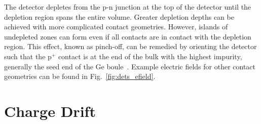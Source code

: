 The detector depletes from the p-n junction at the top of the detector until the depletion region spans the entire volume. Greater depletion depths can be achieved with more complicated contact geometries. However, islands of undepleted zones can form even if all contacts are in contact with the depletion region. This effect, known as pinch-off, can be remedied by orienting the detector such that the p$^+$ contact is at the end of the bulk with the highest impurity, generally the seed end of the Ge boule~\cite{mjd_og}. Example electric fields for other contact geometries can be found in Fig.~\ref{fig:dets_efield}.

\section{Charge Drift}\label{sec:charge_drift}


